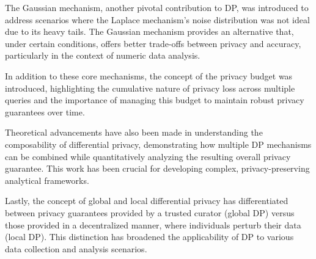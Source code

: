 The Gaussian mechanism, another pivotal contribution to DP, was introduced to address scenarios where the Laplace mechanism's noise distribution was not ideal due to its heavy tails. The Gaussian mechanism provides an alternative that, under certain conditions, offers better trade-offs between privacy and accuracy, particularly in the context of numeric data analysis\cite{Dwork2013}.

In addition to these core mechanisms, the concept of the privacy budget was introduced, highlighting the cumulative nature of privacy loss across multiple queries and the importance of managing this budget to maintain robust privacy guarantees over time\cite{McSherry2007}.

Theoretical advancements have also been made in understanding the composability of differential privacy, demonstrating how multiple DP mechanisms can be combined while quantitatively analyzing the resulting overall privacy guarantee. This work has been crucial for developing complex, privacy-preserving analytical frameworks\cite{Dwork2013}.

Lastly, the concept of global and local differential privacy has differentiated between privacy guarantees provided by a trusted curator (global DP) versus those provided in a decentralized manner, where individuals perturb their data (local DP). This distinction has broadened the applicability of DP to various data collection and analysis scenarios\cite{kasiviswanathan2010learn}.


